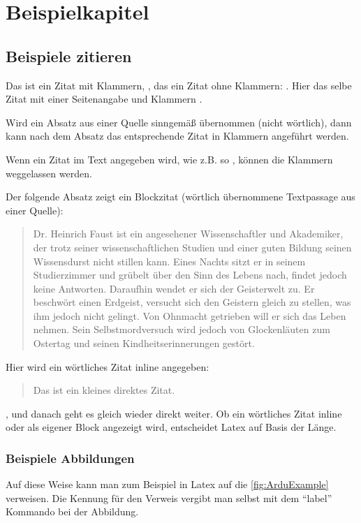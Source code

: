 \chapter{Beispielkapitel}
\section{Beispiele zitieren}

Das ist ein Zitat mit Klammern,
\citep{resnick_distributed_1996}, das ein Zitat ohne Klammern:
\cite{harel_situating_1991}. Hier das selbe Zitat mit einer Seitenangabe und Klammern \citep[S. 23]{resnick_distributed_1996}.

Wird ein Absatz aus einer Quelle sinngemäß übernommen (nicht wörtlich), dann kann nach dem Absatz das entsprechende Zitat in Klammern angeführt werden. \citep[S. 33]{anastopoulou_constructionism_2012}

Wenn ein Zitat im Text angegeben wird, wie z.B. so \cite{beer_rudolf_aspekte_2011}, können die Klammern weggelassen werden.

Der folgende Absatz zeigt ein Blockzitat (wörtlich übernommene Textpassage aus einer Quelle):

\blockcquote[S. 21]{ackermann_piagets_2001}{
Dr. Heinrich Faust ist ein angesehener Wissenschaftler und Akademiker, der trotz seiner wissenschaftlichen Studien und einer guten Bildung seinen Wissensdurst nicht stillen kann. Eines Nachts sitzt er in seinem Studierzimmer und grübelt über den Sinn des Lebens nach, findet jedoch keine Antworten.
Daraufhin wendet er sich der Geisterwelt zu. Er beschwört einen Erdgeist, versucht sich den Geistern gleich zu stellen, was ihm jedoch nicht gelingt. Von Ohnmacht getrieben will er sich das Leben nehmen. Sein Selbstmordversuch wird jedoch von Glockenläuten zum Ostertag und seinen Kindheitserinnerungen gestört.
}

Hier wird ein wörtliches Zitat inline angegeben: \blockcquote{gohlich_lernen:_2007}{Das ist ein kleines direktes Zitat.}, und danach geht es gleich wieder direkt weiter. Ob ein wörtliches Zitat inline oder als eigener Block angezeigt wird, entscheidet Latex auf Basis der Länge.

\def \currentAuthor {Harald Sohm}

\subsection{Beispiele Abbildungen}
Auf diese Weise kann man zum Beispiel in Latex auf die \cref{fig:ArduExample} verweisen. Die Kennung für den Verweis vergibt
man selbst mit dem "`label"' Kommando bei der Abbildung.

